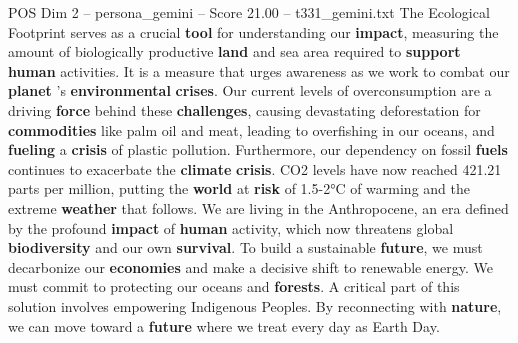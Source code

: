 \begin{textsample}{POS Dim 2 – persona\_gemini – Score 21.00 – t331\_gemini.txt}  \label{ex:f2_pos_043}
The Ecological Footprint serves as a crucial \textbf{tool} for understanding our \textbf{impact}, measuring the amount of biologically productive \textbf{land} and sea area required to \textbf{support} \textbf{human} activities.
It is a measure that urges awareness as we work to combat our \textbf{planet} 's \textbf{environmental} \textbf{crises}.
Our current levels of overconsumption are a driving \textbf{force} behind these \textbf{challenges}, causing devastating deforestation for \textbf{commodities} like palm oil and meat, leading to overfishing in our oceans, and \textbf{fueling} a \textbf{crisis} of plastic pollution.
Furthermore, our dependency on fossil \textbf{fuels} continues to exacerbate the \textbf{climate} \textbf{crisis}.
CO2 levels have now reached 421.21 parts per million, putting the \textbf{world} at \textbf{risk} of 1.5-2°C of warming and the extreme \textbf{weather} that follows.
We are living in the Anthropocene, an era defined by the profound \textbf{impact} of \textbf{human} activity, which now threatens global \textbf{biodiversity} and our own \textbf{survival}.
To build a sustainable \textbf{future}, we must decarbonize our \textbf{economies} and make a decisive shift to renewable energy.
We must commit to protecting our oceans and \textbf{forests}.
A critical part of this solution involves empowering Indigenous Peoples.
By reconnecting with \textbf{nature}, we can move toward a \textbf{future} where we treat every day as Earth Day.

\end{textsample}
